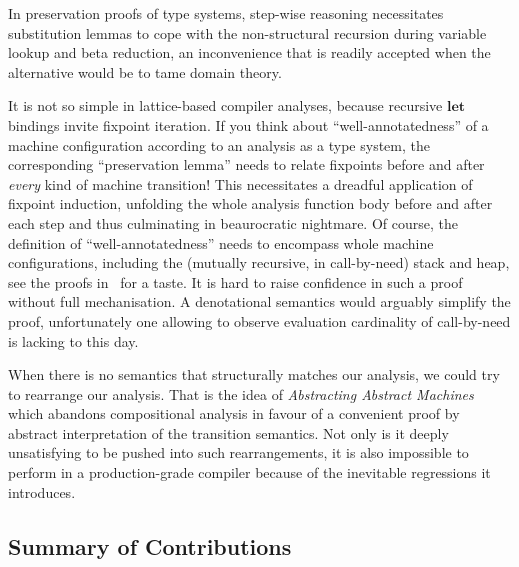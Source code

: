 In preservation proofs of type systems, step-wise reasoning necessitates
substitution lemmas to cope with the non-structural recursion during variable
lookup and beta reduction, an inconvenience that is readily accepted when the
alternative would be to tame domain theory.

It is not so simple in lattice-based compiler analyses, because recursive
$\mathbf{let}$ bindings invite fixpoint iteration. If you think about
``well-annotatedness'' of a machine configuration according to an analysis as a
type system, the corresponding ``preservation lemma'' needs to relate fixpoints
before and after \emph{every} kind of machine transition!
This necessitates a dreadful application of fixpoint induction, unfolding
the whole analysis function body before and after each step and thus culminating
in beaurocratic nightmare.
Of course, the definition of ``well-annotatedness'' needs to encompass whole
machine configurations, including the (mutually recursive, in call-by-need)
stack and heap, see the proofs in~\citep{cardinality-ext} for a taste. It is
hard to raise confidence in such a proof without full mechanisation.
A denotational semantics would arguably simplify the proof, unfortunately one
allowing to observe evaluation cardinality of call-by-need is lacking to this
day.

When there is no semantics that structurally matches our analysis, we could
try to rearrange our analysis. That is the idea of \emph{Abstracting Abstract
Machines}~\citep{aam} which abandons compositional analysis in favour of a
convenient proof by abstract interpretation of the transition semantics.
Not only is it deeply unsatisfying to be pushed into such rearrangements, it
is also impossible to perform in a production-grade compiler because of the
inevitable regressions it introduces.

\subsection{Summary of Contributions}

